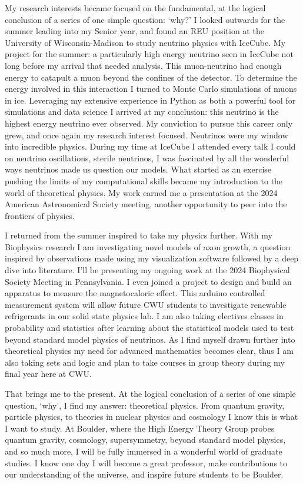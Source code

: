 \documentclass[a4paper, 12pt]{article}
\begin{document}
My research interests became focused on the fundamental, at the logical conclusion of a series of one simple question: `why?' I looked outwards for the summer leading into my Senior year, and found an REU position at the University of Wisconsin-Madison to study neutrino physics with IceCube. My project for the summer: a particularly high energy neutrino seen in IceCube not long before my arrival that needed analysis. This muon-neutrino had enough energy to catapult a muon beyond the confines of the detector. To determine the energy involved in this interaction I turned to Monte Carlo simulations of muons in ice. Leveraging my extensive experience in Python as both a powerful tool for simulations and data science I arrived at my conclusion: this neutrino is the highest energy neutrino ever observed. My conviction to pursue this career only grew, and once again my research interest focused. Neutrinos were my window into incredible physics. During my time at IceCube I attended every talk I could on neutrino oscillations, sterile neutrinos, I was fascinated by all the wonderful ways neutrinos made us question our models. What started as an exercise pushing the limits of my computational skills became my introduction to the world of theoretical physics. My work earned me a presentation at the 2024 American Astronomical Society meeting, another opportunity to peer into the frontiers of physics.

I returned from the summer inspired to take my physics further. With my Biophysics research I am investigating novel models of axon growth, a question inspired by observations made using my visualization software followed by a deep dive into literature. I'll be presenting my ongoing work at the 2024 Biophysical Society Meeting in Pennsylvania. I even joined a project to design and build an apparatus to measure the magnetocaloric effect. This arduino controlled measurement system will allow future CWU students to investigate renewable refrigerants in our solid state physics lab. I am also taking electives classes in probability and statistics after learning about the statistical models used to test beyond standard model physics of neutrinos. As I find myself drawn further into theoretical physics my need for advanced mathematics becomes clear, thus I am also taking sets and logic and plan to take courses in group theory during my final year here at CWU.

That brings me to the present. At the logical conclusion of a series of one simple question, `why', I find my answer: theoretical physics. From quantum gravity, particle physics, to theories in nuclear physics and cosmology I know this is what I want to study. At Boulder, where the High Energy Theory Group probes quantum gravity, cosmology, supersymmetry, beyond standard model physics, and so much more, I will be fully immersed in a wonderful world of graduate studies. I know one day I will become a great professor, make contributions to our understanding of the universe, and inspire future students to be Boulder.
\end{document}
